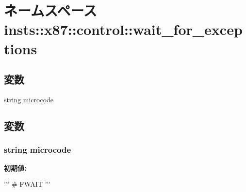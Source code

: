 \hypertarget{namespaceinsts_1_1x87_1_1control_1_1wait__for__exceptions}{
\section{ネームスペース insts::x87::control::wait\_\-for\_\-exceptions}
\label{namespaceinsts_1_1x87_1_1control_1_1wait__for__exceptions}
}
\subsection*{変数}
\begin{DoxyCompactItemize}
\item 
string \hyperlink{namespaceinsts_1_1x87_1_1control_1_1wait__for__exceptions_a770f11a173e99389a8802f0107ed8f52}{microcode}
\end{DoxyCompactItemize}


\subsection{変数}
\hypertarget{namespaceinsts_1_1x87_1_1control_1_1wait__for__exceptions_a770f11a173e99389a8802f0107ed8f52}{
\subsubsection[{microcode}]{\setlength{\rightskip}{0pt plus 5cm}string {\bf microcode}}}
\label{namespaceinsts_1_1x87_1_1control_1_1wait__for__exceptions_a770f11a173e99389a8802f0107ed8f52}
{\bfseries 初期値:}
\begin{DoxyCode}
'''
# FWAIT
'''
\end{DoxyCode}
